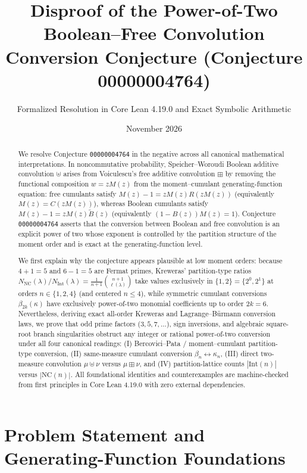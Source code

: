 \documentclass[11pt,a4paper]{article}
\title{\textbf{Disproof of the Power-of-Two Boolean--Free Convolution Conversion Conjecture (Conjecture 00000004764)}}
\author{Formalized Resolution in Core Lean 4.19.0 and Exact Symbolic Arithmetic}
\date{November 2026}
\theoremstyle{definition}
\theoremstyle{remark}
\newcommand{\NC}{\mathrm{NC}}
\newcommand{\IntP}{\mathrm{Int}}
\begin{document}
\maketitle

\begin{abstract}
We resolve Conjecture \texttt{00000004764} in the negative across all canonical mathematical interpretations. In noncommutative probability, Speicher--Woroudi Boolean additive convolution $\uplus$ arises from Voiculescu's free additive convolution $\boxplus$ by removing the functional composition $w = z M(z)$ from the moment--cumulant generating-function equation: free cumulants satisfy $M(z) - 1 = z M(z) R(z M(z))$ (equivalently $M(z) = C(z M(z))$), whereas Boolean cumulants satisfy $M(z) - 1 = z M(z) \tilde{B}(z)$ (equivalently $(1 - B(z)) M(z) = 1$). Conjecture \texttt{00000004764} asserts that the conversion between Boolean and free convolution is an explicit power of two whose exponent is controlled by the partition structure of the moment order and is exact at the generating-function level.

We first explain why the conjecture appears plausible at low moment orders: because $4 + 1 = 5$ and $6 - 1 = 5$ are Fermat primes, Kreweras' partition-type ratios $N_{\NC}(\lambda)/N_{\IntP}(\lambda) = \frac{1}{n+1}\binom{n+1}{\ell(\lambda)}$ take values exclusively in $\{1, 2\} = \{2^0, 2^1\}$ at orders $n \in \{1, 2, 4\}$ (and centered $n \le 4$), while symmetric cumulant conversions $\beta_{2k}(\kappa)$ have exclusively power-of-two monomial coefficients up to order $2k = 6$. Nevertheless, deriving exact all-order Kreweras and Lagrange--B\"urmann conversion laws, we prove that odd prime factors ($3, 5, 7, \dots$), sign inversions, and algebraic square-root branch singularities obstruct any integer or rational power-of-two conversion under all four canonical readings: (I) Bercovici--Pata / moment--cumulant partition-type conversion, (II) same-measure cumulant conversion $\beta_n \leftrightarrow \kappa_n$, (III) direct two-measure convolution $\mu \uplus \nu$ versus $\mu \boxplus \nu$, and (IV) partition-lattice counts $|\IntP(n)|$ versus $|\NC(n)|$. All foundational identities and counterexamples are machine-checked from first principles in Core Lean 4.19.0 with zero external dependencies.
\end{abstract}

\section{Problem Statement and Generating-Function Foundations}
\end{document}
